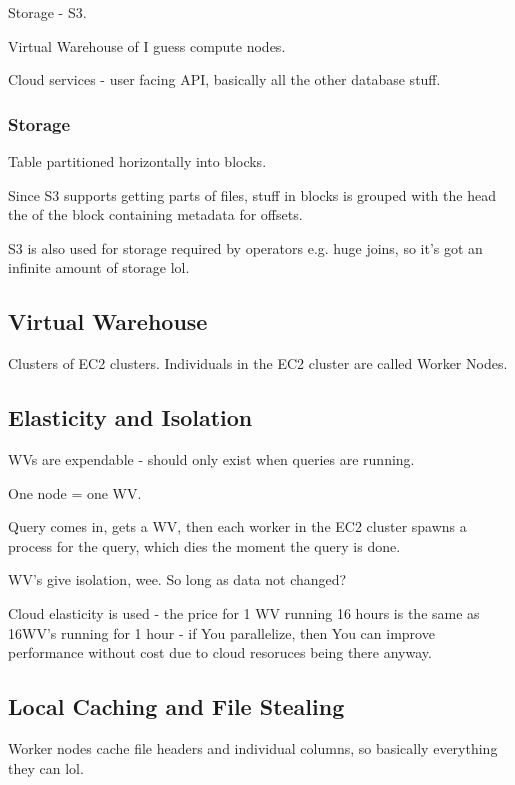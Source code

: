 \documentclass{article}
\begin{document}
		Storage - S3.
		
		Virtual Warehouse of I guess compute nodes.
		
		Cloud services - user facing API, basically all the other database stuff.
		
		\subsubsection{Storage}
		
			Table partitioned horizontally into blocks.
			
			Since S3 supports getting parts of files, stuff in blocks is grouped with the head the of the block containing metadata for offsets.
			
			S3 is also used for storage required by operators e.g. huge joins, so it's got an infinite amount of storage lol.
			
	\subsection{Virtual Warehouse}
	
		Clusters of EC2 clusters. Individuals in the EC2 cluster are called Worker Nodes.
		
	\subsection{Elasticity and Isolation}
	
		WVs are expendable - should only exist when queries are running.
		
		One node = one WV.
		
		Query comes in, gets a WV, then each worker in the EC2 cluster spawns a process for the query, which dies the moment the query is done.
		
		WV's give isolation, wee. So long as data not changed?
		
		Cloud elasticity is used - the price for 1 WV running 16 hours is the same as 16WV's running for 1 hour - if You parallelize, then You can improve performance without cost due to cloud resoruces being there anyway.
		
	\subsection{Local Caching and File Stealing}
	
		Worker nodes cache file headers and individual columns, so basically everything they  can lol.
		
\end{document}

